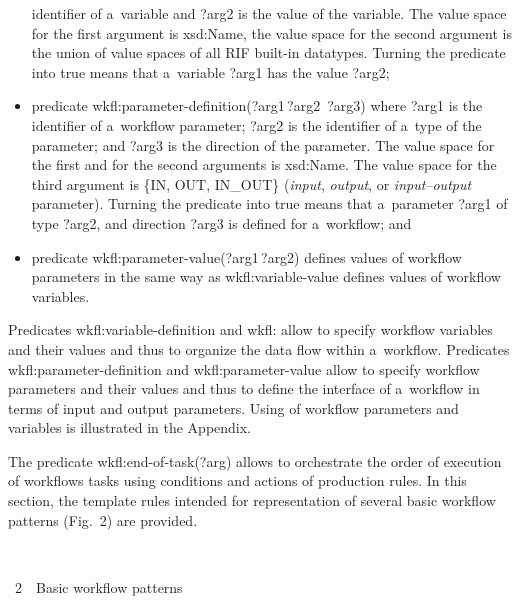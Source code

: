 \begin{multicols}{2}
\begin{itemize}
identifier of a~variable and {\sf ?arg2} is the value of the variable. The value space for
the first argument is {\sf xsd:Name}, the value space for the second argument is the
union of value spaces of all RIF built-in datatypes. Turning the predicate into true
means that a~variable {\sf ?arg1} has the value {\sf ?arg2};
\item predicate {\sf wkfl:parameter-definition(?arg1\,?arg2\,
?arg3)} where
{\sf ?arg1} is the identifier of a~workflow parameter; {\sf ?arg2} is the identifier
of a~type of the parameter; and {\sf ?arg3} is the direction of the parameter. The value
space for the first and for the second arguments is {\sf xsd:Name}. The value space
for the third argument is {\sf \{IN, OUT, IN\_OUT\}}
(\textit{input}, \textit{output}, or
\textit{input--output} parameter).
Turning the predicate into true means that a~parameter {\sf ?arg1} of
type {\sf ?arg2}, and direction {\sf ?arg3} is defined
for a~workflow; and
\item predicate {\sf wkfl:parameter-value(?arg1\,?arg2)} defines values of
workflow parameters in the same way as {\sf wkfl:variable-value} defines values
of workflow variables.
  \end{itemize}

  Predicates {\sf wkfl:variable-definition} and
  {\sf wkfl:} allow
to specify workflow variables and their values and thus to organize the data flow
within a~workflow. Predicates {\sf wkfl:parameter-definition} and
{\sf wkfl:parameter-value} allow to specify workflow parameters and their values
and thus to define the interface of a~workflow in terms of input and output parameters.
Using of workflow parameters and variables is illustrated in the Appendix.

  The predicate {\sf wkfl:end-of-task(?arg)} allows to orchestrate the order of
execution of workflows tasks using conditions and actions of production rules. In this
section, the template rules intended for representation of several basic workflow
patterns (Fig.~2) are provided.

\begin{center}  %
\vspace*{6pt}
\mbox{%
 \epsfxsize=76.913mm
 }
  \vspace*{2pt}

{{\figurename~2}\ \ \small{Basic workflow patterns}}
  \end{center}

\vspace*{6pt}



\end{multicols}
